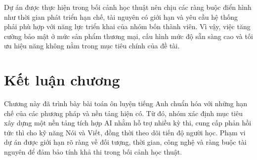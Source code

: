 Dự án được thực hiện trong bối cảnh học thuật nên chịu các ràng buộc điển hình như thời gian phát triển hạn chế, tài nguyên có giới hạn và yêu cầu hệ thống phải phù hợp với năng lực triển khai của nhóm bốn thành viên. Vì vậy, việc tăng cường bảo mật ở mức sản phẩm thương mại, cấu hình mức độ sẵn sàng cao và tối ưu hiệu năng không nằm trong mục tiêu chính của đề tài.


\section{Kết luận chương}
Chương này đã trình bày bài toán ôn luyện tiếng Anh chuẩn hóa với những hạn chế của các phương pháp và nền tảng hiện có. Từ đó, nhóm xác định mục tiêu xây dựng một nền tảng tích hợp AI nhằm hỗ trợ nhiều kỳ thi, cung cấp phản hồi tức thì cho kỹ năng Nói và Viết, đồng thời theo dõi tiến độ người học. Phạm vi dự án được giới hạn rõ ràng về đối tượng, thời gian, công nghệ và ràng buộc tài nguyên để đảm bảo tính khả thi trong bối cảnh học thuật.


